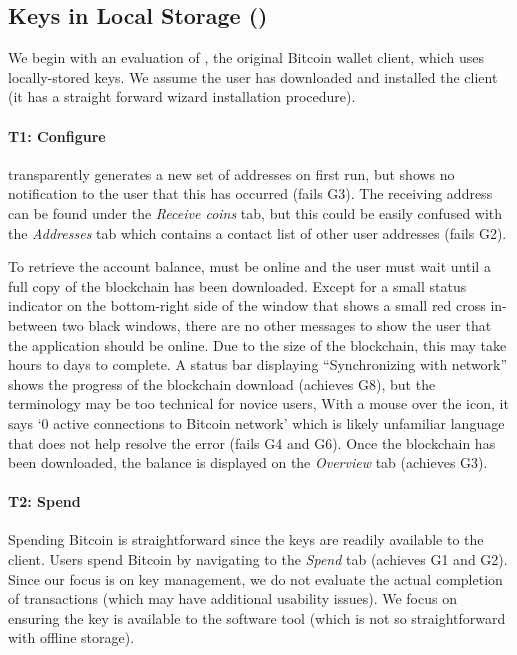 \subsection{Keys in Local Storage (\Bitcoinclient)}
We begin with an evaluation of \Bitcoinclient, the original Bitcoin wallet client, which uses locally-stored keys. We assume the user has downloaded and installed the \Bitcoinclient client (it has a straight forward wizard installation procedure).

\paragraph{T1: Configure} \Bitcoinclient transparently generates a new set of addresses on first run, but shows no notification to the user that this has occurred (fails G3). The receiving address can be found under the \emph{Receive coins} tab, but this could be easily confused with the \emph{Addresses} tab which contains a contact list of other user addresses (fails G2). 

To retrieve the account balance, \Bitcoinclient must be online and the user must wait until a full copy of the blockchain has been downloaded.  Except for a small status indicator on the bottom-right side of the window that shows a small red cross in-between two black windows, there are no other messages to show the user that the application should be online. Due to the size of the blockchain, this may take hours to days to complete. A status bar displaying ``Synchronizing with network'' shows the progress of the blockchain download (achieves G8), but the terminology may be too technical for novice users, With a mouse over the icon, it says `0 active connections to Bitcoin network' which is likely unfamiliar language that does not help resolve the error (fails G4 and G6). Once the blockchain has been downloaded, the balance is displayed on the \emph{Overview} tab (achieves G3). 

\paragraph{T2: Spend} Spending Bitcoin is straightforward since the keys are readily available to the \Bitcoinclient client. Users spend Bitcoin by navigating to the \emph{Spend} tab (achieves G1 and G2). Since our focus is on key management, we do not evaluate the actual completion of transactions (which may have additional usability issues). We focus on ensuring the key is available to the software tool (which is not so straightforward with \eg offline storage). 

